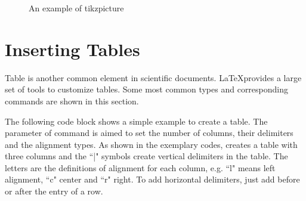 	\begin{figure}[h!]
		\centering
		\caption{An example of tikzpicture}
		\label{tikzpic}
	\end{figure}
	
\section{Inserting Tables}

	Table is another common element in scientific documents. \LaTeX provides a large set of tools to customize tables. Some most common types and corresponding commands are shown in this section.
	
	The following code block shows a simple example to create a table. The parameter of command {\color{blue}{\verb|tabular|}} is aimed to set the number of columns, their delimiters and the alignment types. As shown in the exemplary codes, {} creates a table with three columns and the ``|" symbols create vertical delimiters in the table. The letters are the definitions of alignment for each column, e.g. ``l" means left alignment, ``c" center and ``r" right. To add horizontal delimiters, just add {\color{blue}{\verb|\hline|}} before or after the entry of a row. 
	
